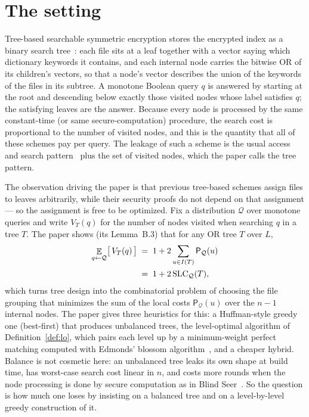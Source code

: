 \documentclass{aicr-conjecture}
\newcommand{\Qd}{\mathcal{Q}}
\newcommand{\Pcost}{\mathsf{P}}
\newcommand{\SLC}{\mathrm{SLC}}
\newcommand{\Exp}{\mathop{\mathbb{E}}}
\begin{document}
\section{The setting}\label{sec:setting}

Tree-based searchable symmetric encryption stores the encrypted index as a
binary search tree~\cite{Goh03,KP13,BlindSeer}: each file sits at a leaf
together with a vector saying which dictionary keywords it contains, and
each internal node carries the bitwise OR of its children's vectors, so
that a node's vector describes the union of the keywords of the files in
its subtree. A monotone Boolean query $q$ is answered by starting at the
root and descending below exactly those visited nodes whose label satisfies
$q$; the satisfying leaves are the answer. Because every node is processed
by the same constant-time (or same secure-computation) procedure, the
search cost is proportional to the number of visited nodes, and this is the
quantity that all of these schemes pay per query. The leakage of such a
scheme is the usual access and search pattern~\cite{CGKO06} plus the set of
visited nodes, which the paper calls the tree pattern.

The observation driving the paper is that previous tree-based schemes
assign files to leaves arbitrarily, while their security proofs do not
depend on that assignment --- so the assignment is free to be optimized.
Fix a distribution $\Qd$ over monotone queries and write $V_T(q)$ for the
number of nodes visited when searching $q$ in a tree $T$. The paper shows
(its Lemma~B.3) that for any OR tree $T$ over $L$,
\begin{align*}
  \Exp_{q \sample \Qd}\bigl[\,V_T(q)\,\bigr]
    &\;=\; 1 + 2 \sum_{u \in I(T)} \Pcost_{\Qd}(u) \\
    &\;=\; 1 + 2\,\SLC_{\Qd}(T),
\end{align*}
which turns tree design into the combinatorial problem of choosing the file
grouping that minimizes the sum of the local costs $\Pcost_{\Qd}(u)$ over
the $n-1$ internal nodes. The paper gives three heuristics for this: a
Huffman-style greedy one (best-first) that produces unbalanced trees, the
level-optimal algorithm of Definition~\ref{def:lo}, which pairs each level
up by a minimum-weight perfect matching computed with Edmonds' blossom
algorithm~\cite{Edm65}, and a cheaper hybrid. Balance is not cosmetic here:
an unbalanced tree leaks its own shape at build time, has worst-case search
cost linear in $n$, and costs more rounds when the node processing is done
by secure computation as in Blind Seer~\cite{BlindSeer}. So the question is
how much one loses by insisting on a balanced tree and on a level-by-level
greedy construction of it.
\end{document}
